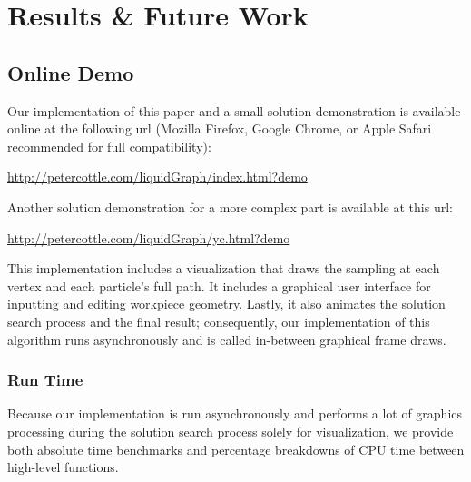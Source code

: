           \chapter{Results \& Future Work}\label{results}


\section{Online Demo}

Our implementation of this paper and a small solution demonstration is available online at the following url (Mozilla Firefox, Google Chrome, or Apple Safari recommended for full compatibility):

\vspace{0.2in}

\begin{centering}
\url{http://petercottle.com/liquidGraph/index.html?demo}
\end{centering}

\vspace{0.2in}

Another solution demonstration for a more complex part is available at this url:

\vspace{0.2in}

\begin{centering}
\url{http://petercottle.com/liquidGraph/yc.html?demo}
\end{centering}

\vspace{0.2in}


\newpage




This implementation includes a visualization that draws the sampling at each vertex and each particle's full path. It includes a graphical user interface for inputting and editing workpiece geometry. Lastly, it also animates the solution search process and the final result; consequently, our implementation of this algorithm runs asynchronously and is called in-between graphical frame draws.

  \subsection{Run Time}

Because our implementation is run asynchronously and performs a lot of graphics processing during the solution search process solely for visualization, we provide both absolute time benchmarks and percentage breakdowns of CPU time between high-level functions.

